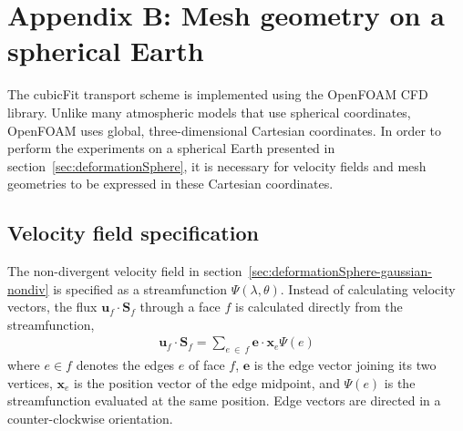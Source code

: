 \section*{Appendix B: Mesh geometry on a spherical Earth}

The cubicFit transport scheme is implemented using the OpenFOAM CFD library.  Unlike many atmospheric models that use spherical coordinates, OpenFOAM uses global, three-dimensional Cartesian coordinates.  In order to perform the experiments on a spherical Earth presented in section~\ref{sec:deformationSphere}, it is necessary for velocity fields and mesh geometries to be expressed in these Cartesian coordinates.


\subsection*{Velocity field specification}
The non-divergent velocity field in section~\ref{sec:deformationSphere-gaussian-nondiv} is specified as a streamfunction $\Psi(\lambda, \theta)$.  Instead of calculating velocity vectors, the flux $\mathbf{u}_f \cdot \mathbf{S}_f$ through a face $f$ is calculated directly from the streamfunction,
\begin{align}
	\mathbf{u}_f \cdot \mathbf{S}_f	= \sum_{e\:\in\:f} \mathbf{e} \cdot \mathbf{x}_e \Psi(e) \label{eqn:nondiv-spherical-flux}
\end{align}
where $e \in f$ denotes the edges $e$ of face $f$, $\mathbf{e}$ is the edge vector joining its two vertices, $\mathbf{x}_e$ is the position vector of the edge midpoint, and $\Psi(e)$ is the streamfunction evaluated at the same position.
Edge vectors are directed in a counter-clockwise orientation.

